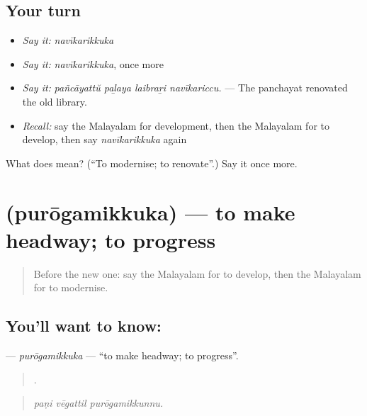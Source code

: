 \subsection*{Your turn}
\begin{itemize}
\raggedright
  \item \emph{Say it:} \emph{navīkarikkuka}
  \item \emph{Say it:} \emph{navīkarikkuka}, once more
  \item \emph{Say it:} \emph{pañcāyattŭ paḻaya laibraṟi navīkariccu.} — The panchayat renovated the old library.
  \item \emph{Recall:} say the Malayalam for development, then the Malayalam for to develop, then say \emph{navīkarikkuka} again
\end{itemize}

\begin{tcolorbox}[breakable,colback=teal!4,colframe=teal!35!black,title={Before you move on}]
What does  mean? (\textquotedblleft{}To modernise; to renovate\textquotedblright{}.) Say it once more.
\end{tcolorbox}
\section[\texorpdfstring{\ml{പുരോഗമിക്കുക} (purōgamikkuka)}{പുരോഗമിക്കുക (purōgamikkuka)}]{ (purōgamikkuka) — to make headway; to progress}

\label{lesson:ML-C431-purogamikkuka}



\begin{quote}
Before the new one: say the Malayalam for to develop, then the Malayalam for to modernise.
\end{quote}

\subsection*{You'll want to know: }
\textbf{} — \emph{purōgamikkuka} — \textquotedblleft{}to make headway; to progress\textquotedblright{}.

\begin{quote}
  .
\end{quote}

\begin{quote}
\emph{paṇi vēgattil purōgamikkunnu.}
\end{quote}

